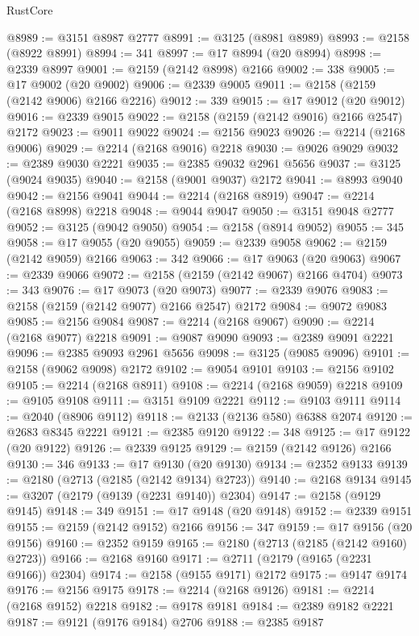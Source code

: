 \begin{lexlean}{RustCore}
\begin{coremodule}
@8989 := @3151 @8987 @2777
@8991 := @3125 (@8981 @8989)
@8993 := @2158 (@8922 @8991)
@8994 := 341
@8997 := @17 @8994 (@20 @8994)
@8998 := @2339 @8997
@9001 := @2159 (@2142 @8998) @2166
@9002 := 338
@9005 := @17 @9002 (@20 @9002)
@9006 := @2339 @9005
@9011 := @2158 (@2159 (@2142 @9006) @2166 @2216)
@9012 := 339
@9015 := @17 @9012 (@20 @9012)
@9016 := @2339 @9015
@9022 := @2158 (@2159 (@2142 @9016) @2166 @2547) @2172
@9023 := @9011 @9022
@9024 := @2156 @9023
@9026 := @2214 (@2168 @9006)
@9029 := @2214 (@2168 @9016) @2218
@9030 := @9026 @9029
@9032 := @2389 @9030 @2221
@9035 := @2385 @9032 @2961 @5656
@9037 := @3125 (@9024 @9035)
@9040 := @2158 (@9001 @9037) @2172
@9041 := @8993 @9040
@9042 := @2156 @9041
@9044 := @2214 (@2168 @8919)
@9047 := @2214 (@2168 @8998) @2218
@9048 := @9044 @9047
@9050 := @3151 @9048 @2777
@9052 := @3125 (@9042 @9050)
@9054 := @2158 (@8914 @9052)
@9055 := 345
@9058 := @17 @9055 (@20 @9055)
@9059 := @2339 @9058
@9062 := @2159 (@2142 @9059) @2166
@9063 := 342
@9066 := @17 @9063 (@20 @9063)
@9067 := @2339 @9066
@9072 := @2158 (@2159 (@2142 @9067) @2166 @4704)
@9073 := 343
@9076 := @17 @9073 (@20 @9073)
@9077 := @2339 @9076
@9083 := @2158 (@2159 (@2142 @9077) @2166 @2547) @2172
@9084 := @9072 @9083
@9085 := @2156 @9084
@9087 := @2214 (@2168 @9067)
@9090 := @2214 (@2168 @9077) @2218
@9091 := @9087 @9090
@9093 := @2389 @9091 @2221
@9096 := @2385 @9093 @2961 @5656
@9098 := @3125 (@9085 @9096)
@9101 := @2158 (@9062 @9098) @2172
@9102 := @9054 @9101
@9103 := @2156 @9102
@9105 := @2214 (@2168 @8911)
@9108 := @2214 (@2168 @9059) @2218
@9109 := @9105 @9108
@9111 := @3151 @9109 @2221
@9112 := @9103 @9111
@9114 := @2040 (@8906 @9112)
@9118 := @2133 (@2136 @580) @6388 @2074
@9120 := @2683 @8345 @2221
@9121 := @2385 @9120
@9122 := 348
@9125 := @17 @9122 (@20 @9122)
@9126 := @2339 @9125
@9129 := @2159 (@2142 @9126) @2166
@9130 := 346
@9133 := @17 @9130 (@20 @9130)
@9134 := @2352 @9133
@9139 := @2180 (@2713 (@2185 (@2142 @9134) @2723))
@9140 := @2168 @9134
@9145 := @3207 (@2179 (@9139 (@2231 @9140)) @2304)
@9147 := @2158 (@9129 @9145)
@9148 := 349
@9151 := @17 @9148 (@20 @9148)
@9152 := @2339 @9151
@9155 := @2159 (@2142 @9152) @2166
@9156 := 347
@9159 := @17 @9156 (@20 @9156)
@9160 := @2352 @9159
@9165 := @2180 (@2713 (@2185 (@2142 @9160) @2723))
@9166 := @2168 @9160
@9171 := @2711 (@2179 (@9165 (@2231 @9166)) @2304)
@9174 := @2158 (@9155 @9171) @2172
@9175 := @9147 @9174
@9176 := @2156 @9175
@9178 := @2214 (@2168 @9126)
@9181 := @2214 (@2168 @9152) @2218
@9182 := @9178 @9181
@9184 := @2389 @9182 @2221
@9187 := @9121 (@9176 @9184) @2706
@9188 := @2385 @9187

\end{coremodule}
\end{lexlean}
